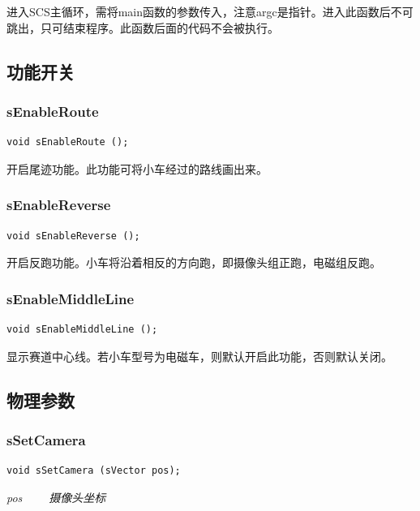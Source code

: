 \documentclass[titlepage,a4paper]{ctexart}
\begin{document}
进入SCS主循环，需将main函数的参数传入，注意argc是指针。进入此函数后不可跳出，只可结束程序。此函数后面的代码不会被执行。 \\

\subsection{功能开关}
\subsubsection{sEnableRoute}
\begin{lstlisting}[numbers=none]
void sEnableRoute ();
\end{lstlisting}

开启尾迹功能。此功能可将小车经过的路线画出来。 \\

\subsubsection{sEnableReverse}
\begin{lstlisting}[numbers=none]
void sEnableReverse ();
\end{lstlisting}

开启反跑功能。小车将沿着相反的方向跑，即摄像头组正跑，电磁组反跑。 \\

\subsubsection{sEnableMiddleLine}
\begin{lstlisting}[numbers=none]
void sEnableMiddleLine ();
\end{lstlisting}

显示赛道中心线。若小车型号为电磁车，则默认开启此功能，否则默认关闭。 \\

\subsection{物理参数}
\subsubsection{sSetCamera}
\begin{lstlisting}[numbers=none]
void sSetCamera (sVector pos);
\end{lstlisting}
\par \emph{pos 　　摄像头坐标}
\end{document}
